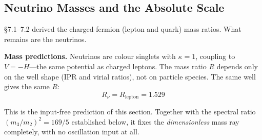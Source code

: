 \documentclass[12pt,a4paper]{article}
\begin{document}
\subsection{Neutrino Masses and the Absolute Scale}

\S7.1--7.2 derived the charged-fermion (lepton and quark) mass ratios. What remains are the neutrinos.

\noindent\textbf{Mass predictions.}\;
Neutrinos are colour singlets with $\kappa = 1$, coupling to $V = -H$---the same potential as charged leptons. The mass ratio $R$ depends only on the well shape (IPR and virial ratios), not on particle species. The same well gives the same $R$:
\[R_\nu = R_\mathrm{lepton} = 1.529\]
\begin{sloppypar}
This is the input-free prediction of this section. Together with the spectral ratio $(m_3/m_2)^2 = 169/5$ established below, it fixes the \emph{dimensionless} mass ray completely, with no oscillation input at all.


\end{sloppypar}
\end{document}

